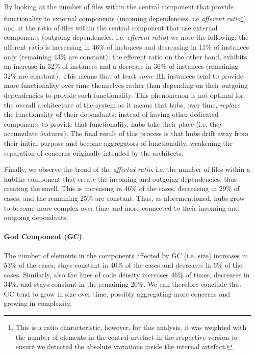 By looking at the number of files within the central component that provide functionality to external components (incoming dependencies, i.e \emph{afferent ratio}\footnote{This is a ratio characteristic, however, for this analysis, it was weighted with the number of elements in the central artefact in the respective version to ensure we detected the absolute variations inside the internal artefact.}) and at the ratio of files within the central component that use external components (outgoing dependencies, i.e. \emph{efferent ratio}) we note the following: the afferent ratio is increasing in 46\% of instances and decreasing in 11\% of instances only (remaining 43\% are constant); the efferent ratio on the other hand, exhibits an increase in 32\% of instances and a decrease in 36\% of instances (remaining 32\% are constant).
This means that at least \emph{some} HL instances tend to provide more functionality over time themselves rather than depending on their outgoing dependencies to provide such functionality.
This phenomenon is not optimal for the overall architecture of the system as it means that hubs, over time, \emph{replace} the functionality of their dependants: instead of having other dedicated components to provide that functionality, hubs take their place (i.e. they accumulate features).
The final result of this process is that hubs drift away from their initial purpose and become aggregators of functionality, weakening the separation of concerns originally intended by the architects. %

Finally, we observe the trend of the \emph{affected ratio}, i.e. the number of files within a hublike component that create the incoming and outgoing dependencies, thus creating the smell. This is increasing in 46\% of the cases, decreasing in 29\% of cases, and the remaining 25\% are constant.
Thus, as aforementioned, hubs grow to become more complex over time and more connected to their incoming and outgoing dependants.

\paragraph{God Component (GC)} The number of elements in the components affected by GC (i.e. size) increases in 53\% of the cases, stays constant in 40\% of the cases and decreases in 6\% of the cases.
Similarly, also the lines of code density increases 46\% of times, decreases in 34\%, and stays constant in the remaining 20\%.
We can therefore conclude that GC tend to grow in size over time, possibly aggregating more concerns and growing in complexity.

